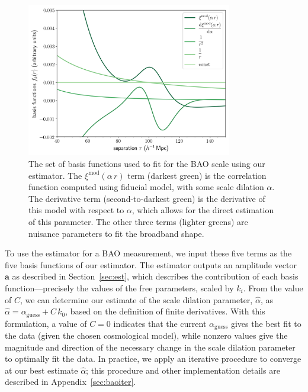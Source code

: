 \documentclass[modern]{aastex62}
\newcommand{\bld}[1]{\bm{#1}}
\begin{document}
\begin{figure}[t]
    \centering
    \includegraphics[width=0.8\textwidth]{bao_bases}
    \caption{The set of basis functions used to fit for the BAO scale using our estimator. The $\xi^\mathrm{mod}(\alpha\,r)$ term (darkest green) is the correlation function computed using fiducial model, with some scale dilation $\alpha$. The derivative term (second-to-darkest green) is the derivative of this model with respect to $\alpha$, which allows for the direct estimation of this parameter. The other three terms (lighter greens) are nuisance parameters to fit the broadband shape.}
    \label{fig:bao_bases}
\end{figure}

To use the estimator for a BAO measurement, we input these five terms as the five basis functions of our estimator.
The estimator outputs an amplitude vector $\bld{a}$ as described in Section~\ref{sec:est}, which describes the contribution of each basis function---precisely the values of the free parameters, scaled by $k_i$.
From the value of $C$, we can determine our estimate of the scale dilation parameter, $\hat{\alpha}$, as $\hat{\alpha} = \alpha_\mathrm{guess} + C\,k_0$, based on the definition of finite derivatives. 
With this formulation, a value of $C=0$ indicates that the current $\alpha_\mathrm{guess}$ gives the best fit to the data (given the chosen cosmological model), while nonzero values give the magnitude and direction of the necessary change in the scale dilation parameter to optimally fit the data.
In practice, we apply an iterative procedure to converge at our best estimate $\hat{\alpha}$; this procedure and other implementation details are described in Appendix~\ref{sec:baoiter}.
\end{document}
